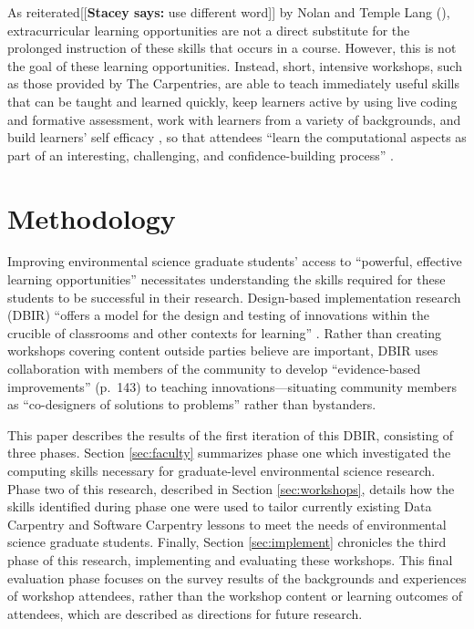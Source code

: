 \documentclass[12pt]{article}
\newcommand{\stacey}[1]{{\color{purple}[[\textbf{Stacey says: }#1]]}}
\begin{document}
\quad As reiterated\stacey{use different word} by Nolan and Temple Lang (\citeyear{esr}), extracurricular
learning opportunities are not a direct substitute for the prolonged instruction
of these skills that occurs in a course. However, this is not the goal 
of these learning opportunities. Instead, short, intensive workshops, such as
those provided by The Carpentries, are able to teach immediately useful skills
that can be taught and learned quickly, keep learners active by using live
coding and formative assessment, work with learners from a variety of
backgrounds, and build learners' self efficacy \citep{null-carpentries}, so that
attendees ``learn the computational aspects as part of an interesting, 
challenging, and confidence-building process'' \citep[p.\ 101]{nolan}.

\section{Methodology}

\quad Improving environmental science graduate students' access to ``powerful,
effective learning opportunities'' \citep[p.\ 137]{penuel} necessitates
understanding the skills required for these students to be successful in their
research. Design-based implementation research (DBIR) \citep{confrey, penuel,
oneill} ``offers a model for the design and testing of innovations
within the crucible of classrooms and other contexts for learning'' 
\citep[p.\ 140]{penuel}. Rather than creating workshops covering content outside
parties believe are important, DBIR uses collaboration with members of the
community to develop ``evidence-based improvements'' (p.\ 143) to teaching 
innovations---situating community members as ``co-designers of solutions to 
problems'' \citep[p.\ 140]{penuel} rather than bystanders. 

\quad This paper describes the results of the first iteration of this DBIR, 
consisting of three phases. Section \ref{sec:faculty} summarizes phase one which 
investigated the computing skills necessary for graduate-level environmental
science research. Phase two of this research, described in Section 
\ref{sec:workshops}, details how the skills identified during phase one were
used to tailor currently existing Data Carpentry \citeyear{data-carpentry} and
Software Carpentry \citeyear{software-carpentry} lessons to meet the needs of
environmental science graduate students. Finally, Section \ref{sec:implement}
chronicles the third phase of this research, implementing and evaluating these
workshops. This final evaluation phase focuses on the survey results of the 
backgrounds and experiences of workshop attendees, rather than the workshop
content or learning outcomes of attendees, which are described as directions for
future research. 
\end{document}
